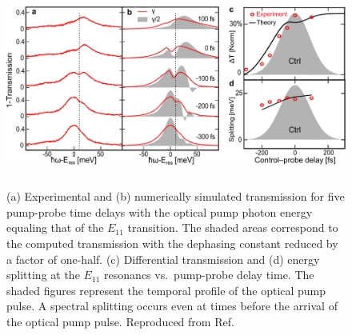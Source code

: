 \begin{figure}[ht]
	\centering
	\includegraphics[height=2.6in]{images/chapter_coherent/resonant}
	\caption{(a) Experimental and (b) numerically simulated transmission for five pump-probe time delays with the optical pump photon energy equaling that of the $E_{11}$ transition. The shaded areas correspond to the computed transmission with the dephasing constant reduced by a factor of one-half. (c) Differential transmission and (d) energy splitting at the $E_{11}$ resonancs vs.\ pump-probe delay time. The shaded figures represent the temporal profile of the optical pump pulse. A spectral splitting occurs even at times before the arrival of the optical pump pulse. Reproduced from Ref.\ \cite{mack2019} }

  \label{fig:ose_kira_resonant}
\end{figure}


